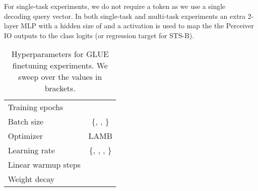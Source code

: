 \documentclass{article} \usepackage{iclr2022_conference,times}
\newcommand{\ourmodel}{Perceiver IO\xspace}
\begin{document}
For single-task experiments, we do not require a  token as we use a single decoding query vector. In both single-task and multi-task experiments an extra 2-layer MLP with a hidden size of  and a  activation is used to map the the \ourmodel{} outputs to the class logits (or regression target for STS-B).


\begin{table}[h]
\centering
 \begin{tabular}{l c}
 \toprule
    Training epochs &  \\
    Batch size & \{, , \} \\ 
 \midrule
    Optimizer & LAMB \\
    Learning rate & \{, , ,  \} \\
    Linear warmup steps &  \\
    Weight decay &  \\
 \bottomrule
\end{tabular}
\vspace{1mm}
\caption{\small Hyperparameters for GLUE finetuning experiments. We sweep over the values in brackets.}
\end{table}
\end{document}
